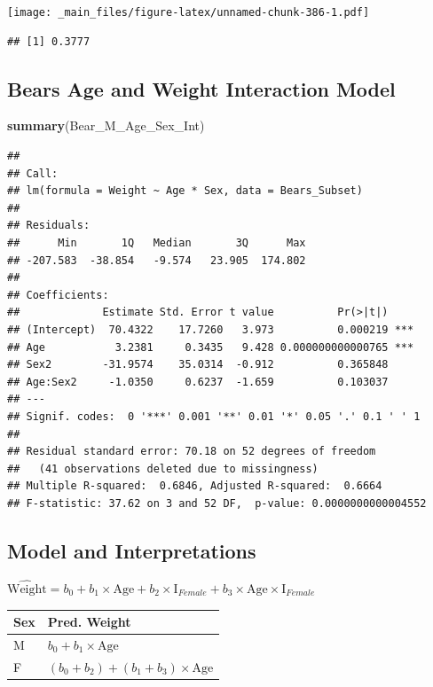 \documentclass[]{book}
\newenvironment{Shaded}{\begin{snugshade}}{\end{snugshade}}
\newcommand{\KeywordTok}[1]{\textcolor[rgb]{0.13,0.29,0.53}{\textbf{#1}}}
\newcommand{\NormalTok}[1]{#1}
\begin{document}
\texttt{[image: \_main\_files/figure-latex/unnamed-chunk-386-1.pdf]}

\begin{verbatim}
## [1] 0.3777
\end{verbatim}

\subsection{Bears Age and Weight Interaction
Model}\label{bears-age-and-weight-interaction-model}

\begin{Shaded}
\begin{Highlighting}[]
\KeywordTok{summary}\NormalTok{(Bear_M_Age_Sex_Int)}
\end{Highlighting}
\end{Shaded}

\begin{verbatim}
## 
## Call:
## lm(formula = Weight ~ Age * Sex, data = Bears_Subset)
## 
## Residuals:
##      Min       1Q   Median       3Q      Max 
## -207.583  -38.854   -9.574   23.905  174.802 
## 
## Coefficients:
##             Estimate Std. Error t value          Pr(>|t|)    
## (Intercept)  70.4322    17.7260   3.973          0.000219 ***
## Age           3.2381     0.3435   9.428 0.000000000000765 ***
## Sex2        -31.9574    35.0314  -0.912          0.365848    
## Age:Sex2     -1.0350     0.6237  -1.659          0.103037    
## ---
## Signif. codes:  0 '***' 0.001 '**' 0.01 '*' 0.05 '.' 0.1 ' ' 1
## 
## Residual standard error: 70.18 on 52 degrees of freedom
##   (41 observations deleted due to missingness)
## Multiple R-squared:  0.6846, Adjusted R-squared:  0.6664 
## F-statistic: 37.62 on 3 and 52 DF,  p-value: 0.0000000000004552
\end{verbatim}

\subsection{Model and Interpretations}\label{model-and-interpretations}

\(\widehat{\text{Weight}}= b_0+ b_1 \times\text{Age}+ b_2\times\text{I}_{Female} + b_3\times\text{Age}\times\text{I}_{Female}\)

\begin{longtable}[]{@{}ll@{}}
\toprule
Sex & Pred. Weight\tabularnewline
\midrule
\endhead
M & \(b_0 + b_1 \times\text{Age}\)\tabularnewline
F & \((b_0 + b_2) + (b_1 + b_3) \times\text{Age}\)\tabularnewline
\bottomrule
\end{longtable}
\end{document}
